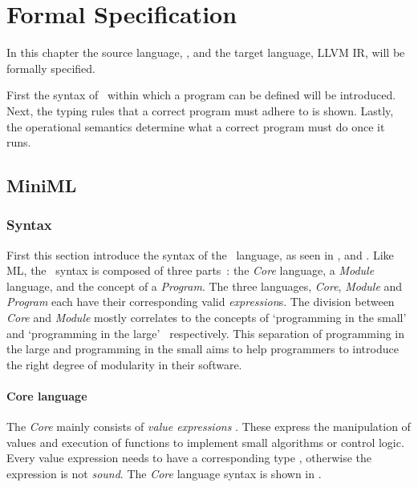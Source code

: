 \chapter{Formal Specification}
\label{chap:formalspecification}
In this chapter the source language, \MiniML, and the target language, LLVM IR, will be formally specified. 

First the syntax of \MiniML\ within which a program can be defined will be introduced.
Next, the typing rules that a correct program must adhere to is shown.
Lastly, the operational semantics determine what a correct program must do once it runs.

\section{MiniML}
\subsection{Syntax}
\label{sec:ch2syntax}
First this section introduce the syntax of the \MiniML\ language, as seen in ,  and .
Like ML, the \MiniML\ syntax is composed of three parts~\cite{Milner:1997:DSM:549659}: the \emph{Core} language, a \emph{Module} language, and the concept of a \emph{Program}. 
The three languages, \emph{Core}, \emph{Module} and \emph{Program} each have their corresponding valid \emph{expression}s.
The division between \emph{Core} and \emph{Module} mostly correlates to the concepts of `programming in the small' and `programming in the large'~\cite{Milner:1997:DSM:549659,DeRemer:1975:PLV:390016.808431} respectively.
This separation of programming in the large and programming in the small aims to help programmers to introduce the right degree of modularity in their software.

\subsubsection{Core language}
The \emph{Core} mainly consists of \emph{value expressions} . 
These express the manipulation of values and execution of functions to implement small algorithms or control logic.
Every value expression  needs to have a corresponding type \cmath{\tau}, otherwise the expression is not \emph{sound}.
The \emph{Core} language syntax is shown in .



